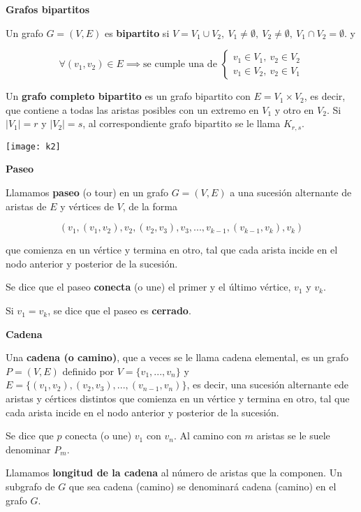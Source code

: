 \documentclass[openany]{book}
\begin{document}
\begin{definition}
  { \color{turquoise} \textbf{Grafos bipartitos}}

  Un grafo $G=(V,E)$ es \textbf{bipartito} si $V = V_1 \cup V_2, \ V_1 \ne \emptyset, \ V_2 \ne \emptyset, \ V_1 \cap V_2 = \emptyset$. y

  $$ \forall (v_1,v_2) \in E \implies \text{se cumple una de }\left\{ \begin{array}{l}
    v_1 \in V_1, \ v_2 \in V_2\\
    v_1 \in V_2, \ v_2 \in V_1
  \end{array} \right. $$

  Un \textbf{grafo completo bipartito} es un grafo bipartito con $E=V_1 \times V_2$, es decir, que contiene a todas las aristas posibles con un extremo en $V_1$ y otro en $V_2$. Si $|V_1| =r$ y $|V_2| =s$, al correspondiente grafo bipartito se le llama $K_{r,s}$.

  \begin{center}
    \texttt{[image: k2]}
  \end{center}
\end{definition}

\newpage

\begin{definition}
  { \color{turquoise} \textbf{Paseo}}

  Llamamos \textbf{paseo} (o tour) en un grafo $G=(V,E)$ a una sucesión alternante de aristas de $ E $ y vértices de $ V $, de la forma

  $$ (v_1,(v_1,v_2), v_2, (v_2, v_3), v_3, ..., v_{k-1}, (v_{k-1}, v_k), v_k) $$

  que comienza en un vértice y termina en otro, tal que cada arista incide en el nodo anterior y posterior de la sucesión.

  Se dice que el paseo \textbf{conecta} (o une) el primer y el último vértice, $v_1$ y $v_k$.

  Si $v_1 = v_k$, se dice que el paseo es \textbf{cerrado}.
\end{definition}

\begin{definition}
  { \color{turquoise} \textbf{Cadena}}

  Una \textbf{cadena (o camino)}, que a veces se le llama cadena elemental, es un grafo $P = (V,E)$ definido por $V = \{ v_1, ..., v_n \}$ y $E = \{ (v_1,v_2), (v_2,v_3), ..., (v_{n-1}, v_n) \}$, es decir, una sucesión alternante ede aristas y cértices distintos que comienza en un vértice y termina en otro, tal que cada arista incide en el nodo anterior y posterior de la sucesión.

  Se dice que $p$ conecta (o une) $v_1$ con $v_n$. Al camino con $ m $ aristas se le suele denominar $P_m$.

  Llamamos \textbf{longitud de la cadena} al número de aristas que la componen. Un subgrafo de $G$ que sea cadena (camino) se denominará cadena (camino) en el grafo $G$.
\end{definition}
\end{document}
